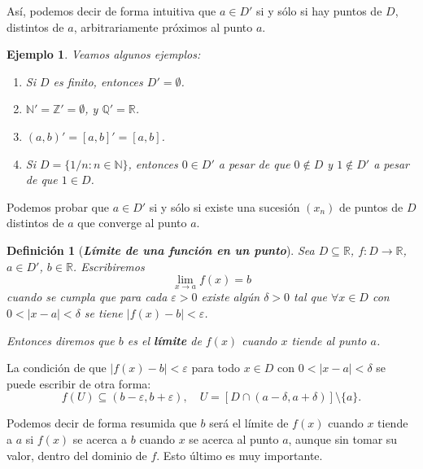 \documentclass[12pt]{article}
\newtheorem{definition}[theorem]{Definición}
\newtheorem{example}{Ejemplo}[theorem]
\begin{document}
Así, podemos decir de forma intuitiva que $a \in D'$ si y sólo si hay puntos de $D$, distintos de $a$, arbitrariamente próximos al punto $a$.

\begin{example}Veamos algunos ejemplos: 
\begin{enumerate}
\item Si $D$ es finito, entonces $D' = \emptyset$.
\item $\mathbb{N}' = \mathbb{Z}' = \emptyset$, y $\mathbb{Q}' = \mathbb{R}$.
\item $(a,b)' = [a,b]' = [a,b]$.
\item Si $D = \lbrace 1/n : n \in \mathbb{N} \rbrace$, entonces $0 \in D'$ a pesar de que $0 \notin D$ y $1 \notin D'$ a pesar de que $1 \in D$.
\end{enumerate}
\end{example}

Podemos probar que $a \in D'$ si y sólo si existe una sucesión $(x_n)$ de puntos de $D$ distintos de $a$ que converge al punto $a$.

\begin{definition}[\textbf{\textit{Límite de una función en un punto}}]Sea $D \subseteq \mathbb{R}$, $f \colon D \longrightarrow \mathbb{R}$, $a \in D'$, $b \in \mathbb{R}$. Escribiremos $$\lim_{x\rightarrow a} f(x) = b$$ cuando se cumpla que para cada $\varepsilon >0$ existe algún $\delta >0$ tal que $\forall x \in D$ con $0 < |x-a | < \delta$ se tiene $|f(x) -b| < \varepsilon$.

Entonces diremos que $b$ es el \textbf{límite} de $f(x)$ cuando $x$ tiende al punto $a$.
\end{definition}

La condición de que $|f(x) -b | < \varepsilon$ para todo $x \in D$ con $0 < |x-a| < \delta$ se puede escribir de otra forma: $$f(U) \subseteq (b- \varepsilon, b + \varepsilon), \quad U = [D \cap (a- \delta, a + \delta)] \setminus \lbrace a \rbrace.$$

Podemos decir de forma resumida que $b$ será el límite de $f(x)$ cuando $x$ tiende a $a$ si $f(x)$ se acerca a $b$ cuando $x$ se acerca al punto $a$, aunque sin tomar su valor, dentro del dominio de $f$. Esto último es muy importante.
\end{document}
